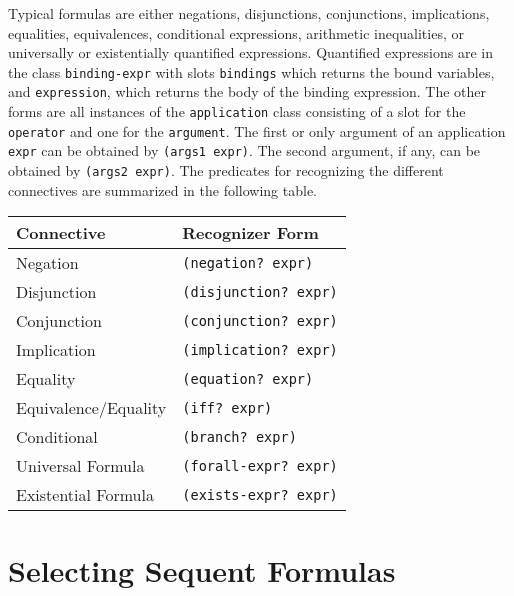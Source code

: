\documentclass[12pt]{book}
\begin{document}
Typical formulas are either negations, disjunctions, conjunctions,
implications, equalities, equivalences, conditional expressions,
arithmetic inequalities, or  universally or existentially
quantified expressions.  Quantified expressions are in the class 
\texttt{binding-expr} with slots \texttt{bindings} which returns the
bound variables, and \texttt{expression}, which returns the body of
the binding expression.  The other forms are all instances of
the \texttt{application} class consisting of a slot for the
\texttt{operator} and one for the \texttt{argument}.  The first or
only argument of an application \texttt{expr} can be obtained by
\texttt{(args1 expr)}\@.  The second argument, if any, can be obtained
by \texttt{(args2 expr)}\@.   The predicates for recognizing
the different connectives are summarized in the following table.
\begin{center}
\begin{tabular}{|l|l|}
\hline
{\bf Connective} & {\bf Recognizer Form}\\\hline
Negation & \texttt{(negation?\ expr)} \\\hline
Disjunction & \texttt{(disjunction?\ expr)} \\\hline
Conjunction & \texttt{(conjunction?\ expr)} \\\hline
Implication & \texttt{(implication?\ expr)} \\\hline
Equality & \texttt{(equation?\ expr)} \\\hline
Equivalence/Equality & \texttt{(iff?\ expr)} \\\hline
Conditional & \texttt{(branch?\ expr)} \\\hline
Universal Formula & \texttt{(forall-expr?\ expr)} \\\hline
Existential Formula & \texttt{(exists-expr?\ expr)} \\\hline
\end{tabular}
\end{center}


\section{Selecting Sequent Formulas}\label{selection}
\end{document}
